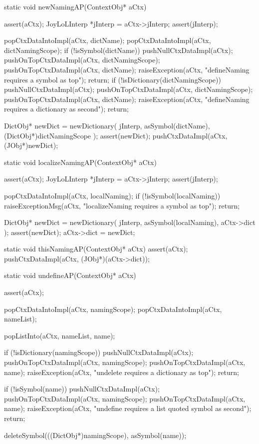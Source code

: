\startCCode
static void newNamingAP(ContextObj* aCtx) {
  assert(aCtx);
  JoyLoLInterp *jInterp = aCtx->jInterp;
  assert(jInterp);

  popCtxDataIntoImpl(aCtx, dictName);
  popCtxDataIntoImpl(aCtx, dictNamingScope);
  if (!isSymbol(dictName)) {
    pushNullCtxDataImpl(aCtx);
    pushOnTopCtxDataImpl(aCtx, dictNamingScope);
    pushOnTopCtxDataImpl(aCtx, dictName);
    raiseException(aCtx,
      "defineNaming requires a symbol as top");
    return;
  }
  if (!isDictionary(dictNamingScope)) {
    pushNullCtxDataImpl(aCtx);
    pushOnTopCtxDataImpl(aCtx, dictNamingScope);
    pushOnTopCtxDataImpl(aCtx, dictName);
    raiseException(aCtx,
      "defineNaming requires a dictionary as second");
    return;
  }

  DictObj* newDict =
    newDictionary(
      jInterp,
      asSymbol(dictName),
      (DictObj*)dictNamingScope
    );
  assert(newDict);
  pushCtxDataImpl(aCtx, (JObj*)newDict);
}
\stopCCode

\startCCode
static void localizeNamingAP(ContextObj* aCtx) {
  assert(aCtx);
  JoyLoLInterp *jInterp = aCtx->jInterp;
  assert(jInterp);
  
  popCtxDataIntoImpl(aCtx, localNaming);
  if (!isSymbol(localNaming)){
    raiseExceptionMsg(aCtx,
      "localizeNaming requires a symbol as top");
    return;
  }
  
  DictObj* newDict = 
    newDictionary(
      jInterp,
      asSymbol(localNaming),
      aCtx->dict
    );
  assert(newDict);
  aCtx->dict = newDict;
}
\stopCCode

\startCCode
static void thisNamingAP(ContextObj* aCtx) {
  assert(aCtx);
  pushCtxDataImpl(aCtx, (JObj*)(aCtx->dict));
}
\stopCCode

\startCCode
static void undefineAP(ContextObj* aCtx) {
  assert(aCtx);
  
  popCtxDataIntoImpl(aCtx, namingScope);
  popCtxDataIntoImpl(aCtx, nameList);
  
  popListInto(aCtx, nameList, name);
  
  if (!isDictionary(namingScope)) {
    pushNullCtxDataImpl(aCtx);
    pushOnTopCtxDataImpl(aCtx, namingScope);
    pushOnTopCtxDataImpl(aCtx, name);
    raiseException(aCtx,
      "undelete requires a dictionary as top");
    return;
  }

  if (!isSymbol(name)) {
    pushNullCtxDataImpl(aCtx);
    pushOnTopCtxDataImpl(aCtx, namingScope);
    pushOnTopCtxDataImpl(aCtx, name);
    raiseException(aCtx,
      "undefine requires a list quoted symbol as second");
    return;
  }
    
  deleteSymbol(((DictObj*)namingScope), asSymbol(name));
  }
\stopCCode

